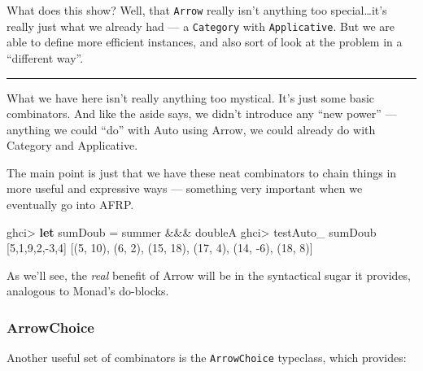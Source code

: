 \documentclass[]{article}
\newenvironment{Shaded}{}{}
\newcommand{\DecValTok}[1]{\textcolor[rgb]{0.25,0.63,0.44}{#1}}
\newcommand{\KeywordTok}[1]{\textcolor[rgb]{0.00,0.44,0.13}{\textbf{#1}}}
\newcommand{\NormalTok}[1]{#1}
\newcommand{\OperatorTok}[1]{\textcolor[rgb]{0.40,0.40,0.40}{#1}}
\newcommand{\OtherTok}[1]{\textcolor[rgb]{0.00,0.44,0.13}{#1}}
\begin{document}
What does this show? Well, that \texttt{Arrow} really isn't anything too
special\ldots it's really just what we already had --- a \texttt{Category} with
\texttt{Applicative}. But we are able to define more efficient instances, and
also sort of look at the problem in a ``different way''.

\begin{center}\rule{0.5\linewidth}{0.5pt}\end{center}

What we have here isn't really anything too mystical. It's just some basic
combinators. And like the aside says, we didn't introduce any ``new power'' ---
anything we could ``do'' with Auto using Arrow, we could already do with
Category and Applicative.

The main point is just that we have these neat combinators to chain things in
more useful and expressive ways --- something very important when we eventually
go into AFRP.

\begin{Shaded}
\begin{Highlighting}[]
\NormalTok{ghci}\OperatorTok{\textgreater{}} \KeywordTok{let}\NormalTok{ sumDoub }\OtherTok{=}\NormalTok{ summer }\OperatorTok{\&\&\&}\NormalTok{ doubleA}
\NormalTok{ghci}\OperatorTok{\textgreater{}}\NormalTok{ testAuto\_ sumDoub [}\DecValTok{5}\NormalTok{,}\DecValTok{1}\NormalTok{,}\DecValTok{9}\NormalTok{,}\DecValTok{2}\NormalTok{,}\OperatorTok{{-}}\DecValTok{3}\NormalTok{,}\DecValTok{4}\NormalTok{]}
\NormalTok{[(}\DecValTok{5}\NormalTok{, }\DecValTok{10}\NormalTok{), (}\DecValTok{6}\NormalTok{, }\DecValTok{2}\NormalTok{), (}\DecValTok{15}\NormalTok{, }\DecValTok{18}\NormalTok{), (}\DecValTok{17}\NormalTok{, }\DecValTok{4}\NormalTok{), (}\DecValTok{14}\NormalTok{, }\OperatorTok{{-}}\DecValTok{6}\NormalTok{), (}\DecValTok{18}\NormalTok{, }\DecValTok{8}\NormalTok{)]}
\end{Highlighting}
\end{Shaded}

As we'll see, the \emph{real} benefit of Arrow will be in the syntactical sugar
it provides, analogous to Monad's do-blocks.

\subsubsection{ArrowChoice}\label{arrowchoice}

Another useful set of combinators is the \texttt{ArrowChoice} typeclass, which
provides:
\end{document}
